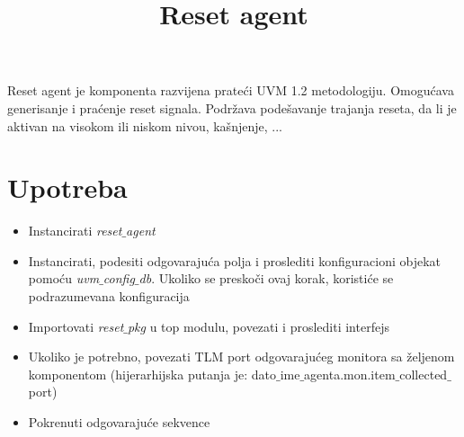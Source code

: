 \documentclass{article}
\title{
  \textmd{\textbf{Reset agent}}
}
\author{}
\date{}
\begin{document}
\maketitle

Reset agent je komponenta razvijena prateći UVM 1.2 metodologiju.
Omogućava generisanje i praćenje reset signala.
Podržava podešavanje trajanja reseta, da li je aktivan na visokom ili niskom
nivou, kašnjenje, ...

\section{Upotreba}

\begin{itemize}
\item Instancirati \emph{reset\(\_\)agent}
\item Instancirati, podesiti odgovarajuća polja i proslediti konfiguracioni
  objekat pomoću \emph{uvm\(\_\)config\(\_\)db}. Ukoliko se preskoči ovaj korak, koristiće
  se podrazumevana konfiguracija
\item Importovati \emph{reset\(\_\)pkg} u top modulu, povezati i proslediti interfejs
\item Ukoliko je potrebno, povezati TLM port odgovarajućeg monitora sa željenom
  komponentom (hijerarhijska putanja je:
  dato\(\_\)ime\(\_\)agenta.mon.item\(\_\)collected\(\_\)port)
\item Pokrenuti odgovarajuće sekvence
\end{itemize}
\end{document}
